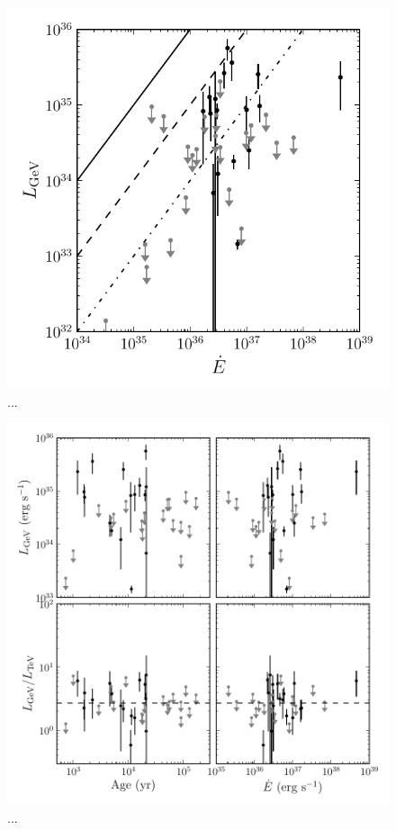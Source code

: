 \begin{figure}[htbp]
  \centering
  \includegraphics{chapters/population_study/figures/pwn_luminosity_vs_edot.pdf}
  \caption{...}
\end{figure}


\begin{figure}[htbp]
  \centering
  \includegraphics{chapters/population_study/figures/pwn_age_edot_vs_l_gev.pdf}
  \caption{...}
\end{figure}


